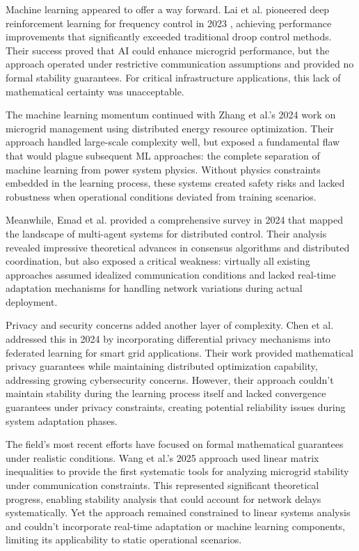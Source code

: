 \documentclass[12pt]{article}
\begin{document}
Machine learning appeared to offer a way forward. Lai et al. pioneered deep reinforcement learning for frequency control in 2023 \cite{lai2023}, achieving performance improvements that significantly exceeded traditional droop control methods. Their success proved that AI could enhance microgrid performance, but the approach operated under restrictive communication assumptions and provided no formal stability guarantees. For critical infrastructure applications, this lack of mathematical certainty was unacceptable.

The machine learning momentum continued with Zhang et al.'s 2024 work \cite{zhang2024} on microgrid management using distributed energy resource optimization. Their approach handled large-scale complexity well, but exposed a fundamental flaw that would plague subsequent ML approaches: the complete separation of machine learning from power system physics. Without physics constraints embedded in the learning process, these systems created safety risks and lacked robustness when operational conditions deviated from training scenarios.

Meanwhile, Emad et al. provided a comprehensive survey in 2024 \cite{emad2024} that mapped the landscape of multi-agent systems for distributed control. Their analysis revealed impressive theoretical advances in consensus algorithms and distributed coordination, but also exposed a critical weakness: virtually all existing approaches assumed idealized communication conditions and lacked real-time adaptation mechanisms for handling network variations during actual deployment.

Privacy and security concerns added another layer of complexity. Chen et al. addressed this in 2024 \cite{chen2024} by incorporating differential privacy mechanisms into federated learning for smart grid applications. Their work provided mathematical privacy guarantees while maintaining distributed optimization capability, addressing growing cybersecurity concerns. However, their approach couldn't maintain stability during the learning process itself and lacked convergence guarantees under privacy constraints, creating potential reliability issues during system adaptation phases.

The field's most recent efforts have focused on formal mathematical guarantees under realistic conditions. Wang et al.'s 2025 approach \cite{wang2025} used linear matrix inequalities to provide the first systematic tools for analyzing microgrid stability under communication constraints. This represented significant theoretical progress, enabling stability analysis that could account for network delays systematically. Yet the approach remained constrained to linear systems analysis and couldn't incorporate real-time adaptation or machine learning components, limiting its applicability to static operational scenarios.
\end{document}

